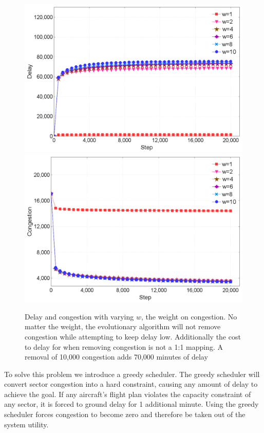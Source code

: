 \documentclass{sig-alternate}
\begin{document}
\begin{figure}[tbh!]
\centering
\includegraphics[width=1.0\columnwidth]{delayPower}
\includegraphics[width=1.0\columnwidth]{congestionPower}
\caption{Delay and congestion with varying $w$, the weight on congestion. No matter the weight, the evolutionary algorithm will not remove congestion while attempting to keep delay low. Additionally the cost to delay for when removing congestion is not a 1:1 mapping. A removal of 10,000 congestion adds 70,000 minutes of delay}
\label{delayCongestionPower}
\end{figure}

To solve this problem we introduce a greedy scheduler. The greedy scheduler will convert sector congestion into a hard constraint, causing any amount of delay to achieve the goal. If any aircraft's flight plan violates the capacity constraint of any sector, it is forced to ground delay for 1 additional minute. Using the greedy scheduler forces congestion to become zero and therefore be taken out of the system utility.
\end{document}
